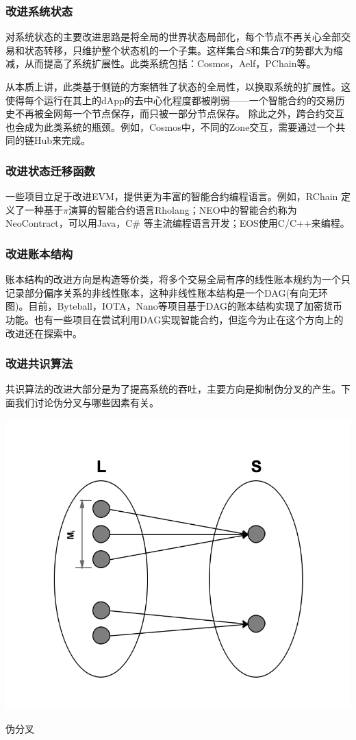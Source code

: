 \documentclass[UTF8,nofonts]{ctexart}
\makeatletter
\newenvironment{figurehere}
 {\def\@captype{figure}}
 {}
\makeatother
\begin{document}
\begin{multicols}{2}
\subsubsection{改进系统状态}
对系统状态的主要改进思路是将全局的世界状态局部化，每个节点不再关心全部交易和状态转移，只维护整个状态机的一个子集。这样集合$S$和集合$T$的势都大为缩减，从而提高了系统扩展性。此类系统包括：Cosmos\cite{cosmos}，Aelf\cite{aelf}，PChain等。

从本质上讲，此类基于侧链的方案牺牲了状态的全局性，以换取系统的扩展性。这使得每个运行在其上的dApp的去中心化程度都被削弱——一个智能合约的交易历史不再被全网每一个节点保存，而只被一部分节点保存。
除此之外，跨合约交互也会成为此类系统的瓶颈。例如，Cosmos中，不同的Zone交互，需要通过一个共同的链Hub来完成\cite{cosmos}。

\subsubsection{改进状态迁移函数}
一些项目立足于改进EVM，提供更为丰富的智能合约编程语言。例如，RChain	定义了一种基于$\pi$演算的智能合约语言Rholang；NEO中的智能合约称为NeoContract，可以用Java，C\# 等主流编程语言开发；EOS使用C/C++来编程。

\subsubsection{改进账本结构}
账本结构的改进方向是构造等价类，将多个交易全局有序的线性账本规约为一个只记录部分偏序关系的非线性账本，这种非线性账本结构是一个DAG(有向无环图)。目前，Byteball\cite{byteball}，IOTA\cite{iota}，Nano\cite{nano}等项目基于DAG的账本结构实现了加密货币功能。也有一些项目在尝试利用DAG实现智能合约，但迄今为止在这个方向上的改进还在探索中。

\subsubsection{改进共识算法}
共识算法的改进大部分是为了提高系统的吞吐，主要方向是抑制伪分叉的产生。下面我们讨论伪分叉与哪些因素有关。

\begin{center}
\begin{figurehere}
\includegraphics[width=.7\linewidth]{image/falsefork.png}
\caption{伪分叉}
\end{figurehere}
\end{center}


\end{multicols}
\end{document}
